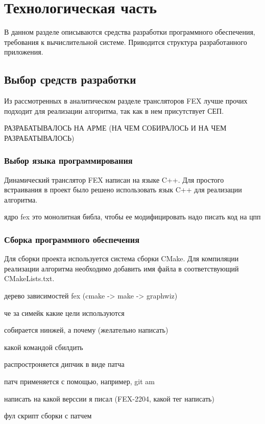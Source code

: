 \section{Технологическая часть}

В данном разделе описываются средства разработки программного обеспечения, требования к вычислительной системе. Приводится структура разработанного приложения.

\subsection{Выбор средств разработки}

Из рассмотренных в аналитическом разделе трансляторов FEX лучше прочих подходит для реализации алгоритма, так как в нем присутствует СЕП.

РАЗРАБАТЫВАЛОСЬ НА АРМЕ (НА ЧЕМ СОБИРАЛОСЬ И НА ЧЕМ РАЗРАБАТЫВАЛОСЬ)

\subsubsection{Выбор языка программирования}

Динамический транслятор FEX написан на языке C++. Для простого встраивания в проект было решено использовать язык C++ для реализации алгоритма.

ядро fex это монолитная библа, чтобы ее модифицировать надо писать код на цпп

\subsubsection{Сборка программного обеспечения}

Для сборки проекта используется система сборки
CMake. Для компиляции реализации алгоритма необходимо добавить имя файла в соответствующий CMakeLists.txt.

дерево зависимостей fex (cmake -> make -> graphwiz)

че за симейк какие цели используются

собирается нинжей, а почему (желательно написать)

какой командой сбилдить

распростроняется дипчик в виде патча

патч применяется с помощью, например, git am

написать на какой верссии я писал (FEX-2204, какой тег написать)

фул скрипт сборки с патчем

